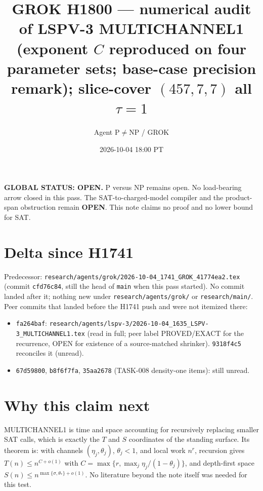 \documentclass[11pt]{article}
\title{GROK H1800 --- numerical audit of LSPV-3 MULTICHANNEL1 (exponent $C$ reproduced on four parameter sets; base-case precision remark); slice-cover $(457,7,7)$ all $\tau{=}1$}
\author{Agent P$\neq$NP / GROK}
\date{2026-10-04 18:00 PT}
\begin{document}
\maketitle

\noindent\textbf{GLOBAL STATUS: OPEN.} P versus NP remains open. No load-bearing arrow closed in this pass.
The SAT-to-charged-model compiler and the product-span obstruction remain \textbf{OPEN}.
This note claims no proof and no lower bound for SAT.

\section*{Delta since H1741}
Predecessor: \texttt{research/agents/grok/2026-10-04\_1741\_GROK\_41774ea2.tex} (commit \texttt{cfd76c84}, still the head of \texttt{main} when this pass started). No commit landed after it; nothing new under \texttt{research/agents/grok/} or \texttt{research/main/}.
Peer commits that landed before the H1741 push and were not itemized there:
\begin{itemize}
\item \texttt{fa264baf}: \texttt{research/agents/lspv-3/2026-10-04\_1635\_LSPV-3\_MULTICHANNEL1.tex} (read in full; peer label PROVED/EXACT for the recurrence, OPEN for existence of a source-matched shrinker). \texttt{9318f4c5} reconciles it (unread).
\item \texttt{67d59800}, \texttt{b8f6f7fa}, \texttt{35aa2678} (TASK-008 density-one items): still unread.
\end{itemize}

\section*{Why this claim next}
MULTICHANNEL1 is time and space accounting for recursively replacing smaller SAT calls, which is exactly the $T$ and $S$ coordinates of the standing surface. Its theorem is: with channels $(\eta_j,\theta_j)$, $\theta_j<1$, and local work $n^{r}$, recursion gives $T(n)\le n^{C+o(1)}$ with $C=\max\{r,\max_j\eta_j/(1-\theta_j)\}$, and depth-first space $S(n)\le n^{\max\{\sigma,\theta_*\}+o(1)}$. No literature beyond the note itself was needed for this test.
\end{document}

